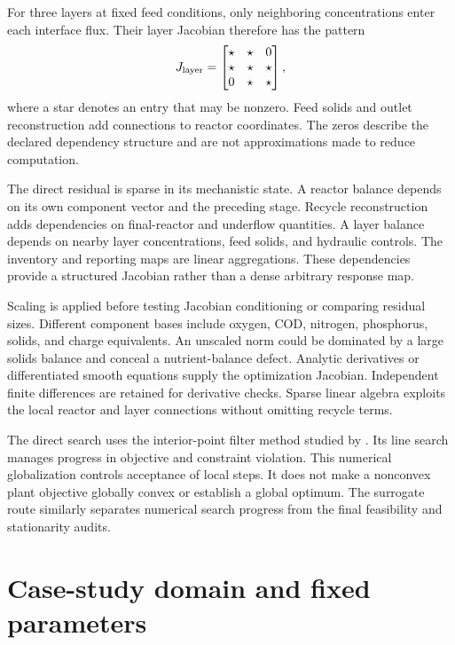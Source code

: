 For three layers at fixed feed conditions, only neighboring concentrations enter each interface flux. Their layer Jacobian therefore has the pattern
\begin{equation}
\equationname{Tridiagonal sparsity pattern of the clarifier-layer Jacobian}
J_{\rm layer}=\begin{bmatrix}\star&\star&0\\\star&\star&\star\\0&\star&\star\end{bmatrix},
\end{equation}
where a star denotes an entry that may be nonzero. Feed solids and outlet reconstruction add connections to reactor coordinates. The zeros describe the declared dependency structure and are not approximations made to reduce computation.

The direct residual is sparse in its mechanistic state. A reactor balance depends on its own component vector and the preceding stage. Recycle reconstruction adds dependencies on final-reactor and underflow quantities. A layer balance depends on nearby layer concentrations, feed solids, and hydraulic controls. The inventory and reporting maps are linear aggregations. These dependencies provide a structured Jacobian rather than a dense arbitrary response map.

Scaling is applied before testing Jacobian conditioning or comparing residual sizes. Different component bases include oxygen, COD, nitrogen, phosphorus, solids, and charge equivalents. An unscaled norm could be dominated by a large solids balance and conceal a nutrient-balance defect. Analytic derivatives or differentiated smooth equations supply the optimization Jacobian. Independent finite differences are retained for derivative checks. Sparse linear algebra exploits the local reactor and layer connections without omitting recycle terms.

The direct search uses the interior-point filter method studied by \citet{WachterBiegler2006}. Its line search manages progress in objective and constraint violation. This numerical globalization controls acceptance of local steps. It does not make a nonconvex plant objective globally convex or establish a global optimum. The surrogate route similarly separates numerical search progress from the final feasibility and stationarity audits.

\section{Case-study domain and fixed parameters}

